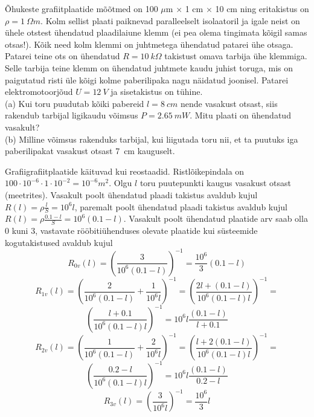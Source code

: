 Õhukeste grafiitplaatide mõõtmed on 100 $\mu$m $\times$ 1 cm $\times$ 10 cm ning eritakistus on $\rho =  \SI{1}{\Omega m}$. Kolm sellist plaati paiknevad paralleelselt isolaatoril ja igale neist on ühele otstest ühendatud plaadilaiune klemm (ei pea olema tingimata kõigil samas otsas!). Kõik need kolm klemmi on juhtmetega ühendatud patarei ühe otsaga. Patarei teine ots on ühendatud $R = \SI{10}{k \Omega}$ takistust omava tarbija ühe klemmiga. Selle tarbija teine klemm on ühendatud juhtmete kaudu juhist toruga, mis on paigutatud risti üle kõigi kolme paberilipaka nagu näidatud joonisel. Patarei elektromotoorjõud $U =\SI{12}{V}$ ja sisetakistus on tühine.
\\(a) Kui toru puudutab kõiki pabereid $l = \SI{8}{cm}$ nende vasakust otsast, siis rakendub tarbijal ligikaudu võimsus $P = \SI{2,65}{mW}$. Mitu plaati on ühendatud vasakult? 
\\(b) Milline võimsus rakenduks tarbijal, kui liigutada toru nii, et ta puutuks iga paberilipakat vasakust otsast \SI{7}{cm} kauguselt.






\hint

\solu
Grafiigrafiitplaatide käituvad kui reostaadid.
Ristlõikepindala on $100 \cdot 10^{-6} \cdot 1 \cdot 10^{-2} = 10^{-6} \si{m^2}$.
Olgu $l$ toru puutepunkti kaugus vasakust otsast (meetrites).
Vasakult poolt ühendatud plaadi takistus avaldub kujul $R(l)=\rho \frac{l}{S} = 10^6 l $, paremalt poolt ühendatud plaadi takistus avaldub kujul $R(l)= \rho \frac{0.1 - l}{S} = 10^6 (0.1-l) $.
Vasakult poolt ühendatud plaatide arv saab olla 0 kuni 3, vastavate rööbitiühenduses olevate plaatide kui süsteemide kogutakistused avaldub kujul
\[ R_{0v}(l) = \left(\frac{3}{10^6 (0.1-l)} \right)^{-1} =  \frac{10^6}{3} (0.1-l) \]
\[ R_{1v}(l) = \left(\frac{2}{10^6 (0.1-l) } + \frac{1}{10^6 l } \right)^{-1} =  
\left(\frac{2l +(0.1-l)}{10^6 (0.1-l)l }\right)^{-1} = \]
\[ \left(\frac{l +0.1}{10^6 (0.1-l)l }\right)^{-1} =10^6 l\frac{(0.1-l)}{l+0.1} \]
\[ R_{2v}(l) = \left(\frac{1}{10^6 (0.1-l) } + \frac{2}{10^6 l } \right)^{-1} =  
\left(\frac{l +2(0.1-l)}{10^6 (0.1-l)l }\right)^{-1} = \]
\[ \left(\frac{0.2-l}{10^6 (0.1-l)l }\right)^{-1} =10^6 l \frac{(0.1-l)}{0.2-l} \]
\[ R_{3v}(l) = \left(\frac{3}{10^6 l} \right)^{-1} =  \frac{10^6}{3}l\]

